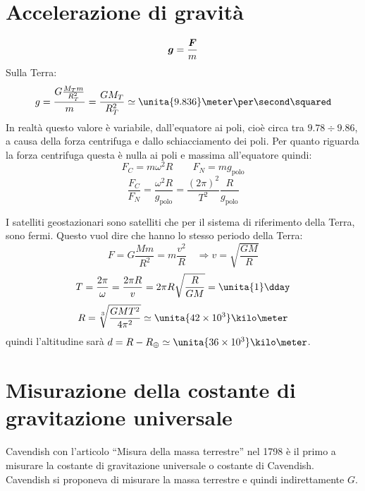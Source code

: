 \section{Accelerazione di gravità}
\begin{equation*}\boldsymbol{g}=\frac{\boldsymbol{F}}{m}\end{equation*}
Sulla Terra: \begin{equation*}g = \frac{G\frac{M_Tm}{R_T^2}}{m}=\frac{GM_T}{R_T^2}\simeq \unita{9.836}\meter\per\second\squared\end{equation*}
In realtà questo valore è variabile, dall'equatore ai poli, cioè
circa tra $9.78\div9.86$, a causa della forza centrifuga e dallo
schiacciamento dei poli. Per quanto riguarda la forza centrifuga
questa è nulla ai poli e massima all'equatore quindi:
\begin{equation*}F_C=m\omega^2R\qquad F_N=mg_{\text{polo}}\end{equation*}
\begin{equation*}\frac{F_C}{F_N}=\frac{\omega^2R}{g_{\text{polo}}}=\frac{(2\pi)^2}{T^2}\frac{R}{g_{\text{polo}}}\end{equation*}
\begin{Es}
 I satelliti geostazionari sono satelliti che per il sistema di riferimento della Terra, sono fermi. Questo vuol dire che hanno lo stesso periodo della Terra:
\begin{equation*}
 F = G\frac{Mm}{R^2} = m\frac{v^2}{R}\quad\Rightarrow v=\sqrt{\frac{GM}{R}}
\end{equation*}
\begin{equation*}
 T = \frac{2 \pi}{\omega} = \frac{2\pi R}{v} = 2\pi R\sqrt{\frac{R}{GM}} = \unita{1}\dday
\end{equation*}
\begin{equation*}
 R = \sqrt[3]{\frac{GMT^2}{4\pi^2}}\simeq \unita{42\times 10^3}\kilo\meter
\end{equation*}
quindi l'altitudine sarà $d = R - R_\oplus\simeq \unita{36\times 10^3}\kilo\meter$.
\end{Es}

\section{Misurazione della costante di gra\-vi\-ta\-zio\-ne u\-ni\-ver\-sa\-le}
Cavendish con l'articolo ``Misura della massa terrestre'' nel
1798 è il primo a misurare la costante di gravitazione universale
o costante di Cavendish. Cavendish si proponeva di misurare la
massa terrestre e quindi indirettamente $G$.

